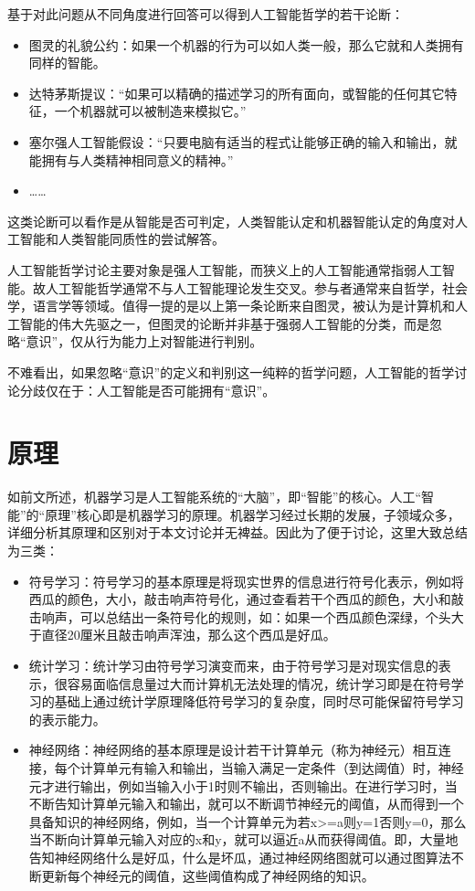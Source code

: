 \documentclass[fontset=fandol,UTF8]{article}
\begin{document}
基于对此问题从不同角度进行回答可以得到人工智能哲学的若干论断：
\begin{itemize}
\item 图灵的礼貌公约：如果一个机器的行为可以如人类一般，那么它就和人类拥有同样的智能。\cite{turing}
\item 达特茅斯提议：“如果可以精确的描述学习的所有面向，或智能的任何其它特征，一个机器就可以被制造来模拟它。”\cite{mouth}
\item 塞尔强人工智能假设：“只要电脑有适当的程式让能够正确的输入和输出，就能拥有与人类精神相同意义的精神。”\cite{wikihp}
\item ……
\end{itemize}
这类论断可以看作是从智能是否可判定，人类智能认定和机器智能认定的角度对人工智能和人类智能同质性的尝试解答。

人工智能哲学讨论主要对象是强人工智能，而狭义上的人工智能通常指弱人工智能。故人工智能哲学通常不与人工智能理论发生交叉。参与者通常来自哲学，社会学，语言学等领域。值得一提的是以上第一条论断来自图灵，被认为是计算机和人工智能的伟大先驱之一，但图灵的论断并非基于强弱人工智能的分类，而是忽略“意识”，仅从行为能力上对智能进行判别。

不难看出，如果忽略“意识”的定义和判别这一纯粹的哲学问题，人工智能的哲学讨论分歧仅在于：人工智能是否可能拥有“意识”。


\section{原理}
如前文所述，机器学习是人工智能系统的“大脑”，即“智能”的核心。人工“智能”的“原理”核心即是机器学习的原理。机器学习经过长期的发展，子领域众多，详细分析其原理和区别对于本文讨论并无裨益。因此为了便于讨论，这里大致总结为三类：
\begin{itemize}
\item 符号学习：符号学习的基本原理是将现实世界的信息进行符号化表示，例如将西瓜的颜色，大小，敲击响声符号化，通过查看若干个西瓜的颜色，大小和敲击响声，可以总结出一条符号化的规则，如：如果一个西瓜颜色深绿，个头大于直径20厘米且敲击响声浑浊，那么这个西瓜是好瓜。
\item 统计学习：统计学习由符号学习演变而来，由于符号学习是对现实信息的表示，很容易面临信息量过大而计算机无法处理的情况，统计学习即是在符号学习的基础上通过统计学原理降低符号学习的复杂度，同时尽可能保留符号学习的表示能力。
\item 神经网络：神经网络的基本原理是设计若干计算单元（称为神经元）相互连接，每个计算单元有输入和输出，当输入满足一定条件（到达阈值）时，神经元才进行输出，例如当输入小于1时则不输出，否则输出。在进行学习时，当不断告知计算单元输入和输出，就可以不断调节神经元的阈值，从而得到一个具备知识的神经网络，例如，当一个计算单元为若x>=a则y=1否则y=0，那么当不断向计算单元输入对应的x和y，就可以逼近a从而获得阈值。即，大量地告知神经网络什么是好瓜，什么是坏瓜，通过神经网络图就可以通过图算法不断更新每个神经元的阈值，这些阈值构成了神经网络的知识。
\end{itemize}
\end{document}
